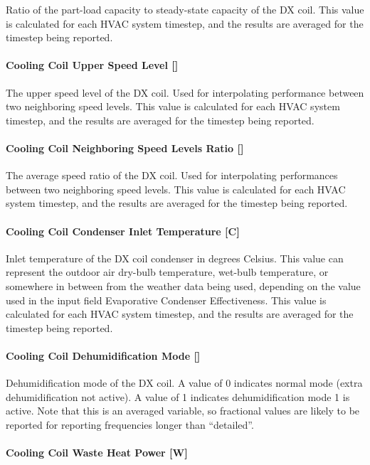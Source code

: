 Ratio of the part-load capacity to steady-state capacity of the DX coil. This value is calculated for each HVAC system timestep, and the results are averaged for the timestep being reported.

\paragraph{Cooling Coil Upper Speed Level {[]}}

The upper speed level of the DX coil. Used for interpolating performance between two neighboring speed levels. This value is calculated for each HVAC system timestep, and the results are averaged for the timestep being reported.

\paragraph{Cooling Coil Neighboring Speed Levels Ratio {[]}}

The average speed ratio of the DX coil. Used for interpolating performances between two neighboring speed levels. This value is calculated for each HVAC system timestep, and the results are averaged for the timestep being reported.

\paragraph{Cooling Coil Condenser Inlet Temperature {[C]}}

Inlet temperature of the DX coil condenser in degrees Celsius. This value can represent the outdoor air dry-bulb temperature, wet-bulb temperature, or somewhere in between from the weather data being used, depending on the value used in the input field Evaporative Condenser Effectiveness. This value is calculated for each HVAC system timestep, and the results are averaged for the timestep being reported.

\paragraph{Cooling Coil Dehumidification Mode {[]}}

Dehumidification mode of the DX coil. A value of 0 indicates normal mode (extra dehumidification not active). A value of 1 indicates dehumidification mode 1 is active. Note that this is an averaged variable, so fractional values are likely to be reported for reporting frequencies longer than “detailed”.

\paragraph{Cooling Coil Waste Heat Power {[}W{]}}

